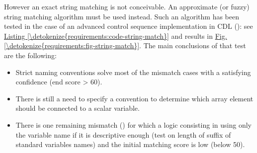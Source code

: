 \documentclass[letterpaper,10pt, openany,english]{sphinxmanual}
\begin{document}
However an exact string matching is not conceivable. An approximate (or fuzzy) string matching algorithm must be used instead. Such an algorithm has been tested in the case of an advanced control sequence implementation in CDL (): see \hyperref[\detokenize{requirements:code-string-match}]{Listing \ref{\detokenize{requirements:code-string-match}}} and results in \hyperref[\detokenize{requirements:fig-string-match}]{Fig.\@ \ref{\detokenize{requirements:fig-string-match}}}. The main conclusions of that test are the following:
\begin{itemize}
\item {} 
Strict naming conventions solve most of the mismatch cases with a satisfying confidence (end score \textgreater{} 60).

\item {} 
There is still a need to specify a convention to determine which array element should be connected to a scalar variable.

\item {} 
There is one remaining mismatch () for which a logic consisting in using only the variable name if it is descriptive enough (test on length of suffix of standard variables names) and the initial matching score is low (below 50).

\end{itemize}
\def\sphinxLiteralBlockLabel{\label{\detokenize{requirements:code-string-match}}}
\end{document}
